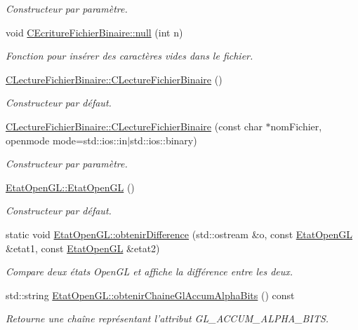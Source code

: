 \begin{DoxyCompactItemize}
\begin{DoxyCompactList}\small\item\em Constructeur par paramètre. \end{DoxyCompactList}\item 
void \hyperlink{group__utilitaire_ga7145545254c30909311d3b1ef0bdd07a}{C\-Ecriture\-Fichier\-Binaire\-::null} (int n)
\begin{DoxyCompactList}\small\item\em Fonction pour insérer des caractères vides dans le fichier. \end{DoxyCompactList}\item 
\hyperlink{group__utilitaire_ga3a259905a2c14513846e6ecb8cf476ad}{C\-Lecture\-Fichier\-Binaire\-::\-C\-Lecture\-Fichier\-Binaire} ()
\begin{DoxyCompactList}\small\item\em Constructeur par défaut. \end{DoxyCompactList}\item 
\hyperlink{group__utilitaire_gac16ebab7b172408c2ba14605f61f0f84}{C\-Lecture\-Fichier\-Binaire\-::\-C\-Lecture\-Fichier\-Binaire} (const char $\ast$nom\-Fichier, openmode mode=std\-::ios\-::in$\vert$std\-::ios\-::binary)
\begin{DoxyCompactList}\small\item\em Constructeur par paramètre. \end{DoxyCompactList}\item 
\hyperlink{group__utilitaire_gaf682f61929f2502b08b6b88de07349b6}{Etat\-Open\-G\-L\-::\-Etat\-Open\-G\-L} ()
\begin{DoxyCompactList}\small\item\em Constructeur par défaut. \end{DoxyCompactList}\item 
static void \hyperlink{group__utilitaire_ga24ddfdab3e65cc4069b86ba84d3f565b}{Etat\-Open\-G\-L\-::obtenir\-Difference} (std\-::ostream \&o, const \hyperlink{class_etat_open_g_l}{Etat\-Open\-G\-L} \&etat1, const \hyperlink{class_etat_open_g_l}{Etat\-Open\-G\-L} \&etat2)
\begin{DoxyCompactList}\small\item\em Compare deux états Open\-G\-L et affiche la différence entre les deux. \end{DoxyCompactList}\item 
std\-::string \hyperlink{group__utilitaire_ga13c8aaca9f02431b47b83e36b18f8067}{Etat\-Open\-G\-L\-::obtenir\-Chaine\-Gl\-Accum\-Alpha\-Bits} () const 
\begin{DoxyCompactList}\small\item\em Retourne une chaîne représentant l'attribut G\-L\-\_\-\-A\-C\-C\-U\-M\-\_\-\-A\-L\-P\-H\-A\-\_\-\-B\-I\-T\-S. \end{DoxyCompactList}\item 

\end{DoxyCompactItemize}
